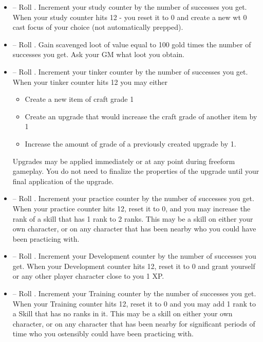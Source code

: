 \begin{GRPquicknotewide}
\begin{itemize}
	\item {}-- Roll . Increment your study counter by the number of successes you get. When your study counter hits 12 - you reset it to 0 and create a new wt 0 cast focus of your choice (not automatically prepped).
	\item {}-- Roll . Gain scavenged loot of value equal to 100 gold times the number of successes you get. Ask your GM what loot you obtain. 
	\item {}-- Roll . Increment your tinker counter by the number of successes you get. When your tinker counter hits 12 you may either
	\begin{itemize}
		\item Create a new item of craft grade 1
		\item Create an upgrade that would increase the craft grade of another item by 1
		\item Increase the amount of grade of a previously created upgrade by 1.
	\end{itemize}
	Upgrades may be applied immediately or at any point during freeform gameplay. You do not need to finalize the properties of the upgrade until your final application of the upgrade.
	\item {}-- Roll . Increment your practice counter by the number of successes you get. When your practice counter hits 12, reset it to 0, and you may increase the rank of a skill that has 1 rank to 2 ranks. This may be a skill on either your own character, or on any character that has been nearby who you could have been practicing with.
	\item {}-- Roll . Increment your Development counter by the number of successes you get. When your Development counter hits 12, reset it to 0 and grant yourself or any other player character close to you 1 XP.
	\item {}-- Roll . Increment your Training counter by the number of successes you get. When your Training counter hits 12, reset it to 0 and you may add 1 rank to a Skill that has no ranks in it. This may be a skill on either your own character, or on any character that has been nearby for significant periods of time who you ostensibly could have been practicing with.

\end{itemize}
\end{GRPquicknotewide}
